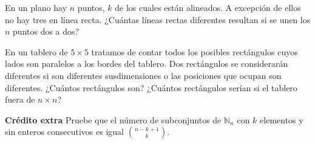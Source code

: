 \begin{problema}
En un plano hay $n$ puntos, $k$ de los cuales están alineados. A excepción de ellos no hay tres en línea recta. ¿Cuántas líneas rectas diferentes resultan si se unen los $n$ puntos dos a dos?
\end{problema}

\begin{problema}
En un tablero de $5\times 5$ tratamos de contar todos los posibles rectángulos cuyos lados son paralelos a los bordes del tablero. Dos rectángulos se considerarán diferentes si son diferentes susdimensiones o las posiciones que ocupan son diferentes. ¿Cuántos rectángulos son? ¿Cuántos rectángulos serían si el tablero fuera de $n\times n$?
\end{problema}

\textbf{Crédito extra} Pruebe que el número de subconjuntos de $\mathbb{N}_n$ con $k$ elementos y sin enteros consecutivos es igual $\displaystyle \binom{n-k+1}{k}$.